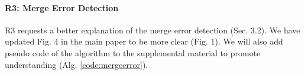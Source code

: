 \documentclass[10pt,twocolumn,letterpaper]{article}
\begin{document}

\vspace{-5mm}


\paragraph{R3: Merge Error Detection}
R3 requests a better explanation of the merge error detection (Sec. 3.2). We have updated Fig. 4 in the main paper to be more clear (Fig. 1). We will also add pseudo code of the algorithm to the supplemental material to promote understanding (Alg. \ref{code:mergeerror}).
\end{document}
